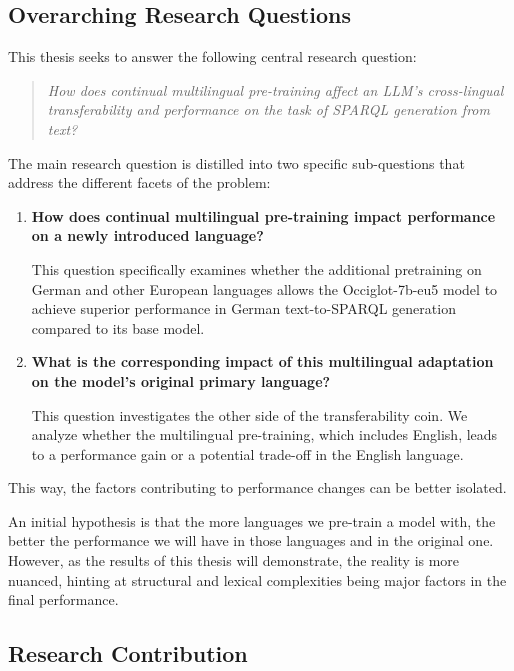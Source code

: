 \subsection{Overarching Research Questions}

This thesis seeks to answer the following central research question:
\begin{quote}
\textit{How does continual multilingual pre-training affect an LLM's cross-lingual transferability and performance on the task of SPARQL generation from text?}
\end{quote}

The main research question is distilled into two specific sub-questions that address the different facets of the problem:

\begin{enumerate}
    \item \textbf{How does continual multilingual pre-training impact performance on a newly introduced language?}
    
    This question specifically examines whether the additional pretraining on German and other European languages allows the Occiglot-7b-eu5 model to achieve superior performance in German text-to-SPARQL generation compared to its base model.

    \item \textbf{What is the corresponding impact of this multilingual adaptation on the model's original primary language?}
    
    This question investigates the other side of the transferability coin. We analyze whether the multilingual pre-training, which includes English, leads to a performance gain or a potential trade-off in the English language. 
\end{enumerate}

This way, the factors contributing to performance changes can be better isolated.

An initial hypothesis is that the more languages we pre-train a model with, the better the performance we will have in those languages and in the original one. 
However, as the results of this thesis will demonstrate, the reality is more nuanced, hinting at structural and lexical complexities being major factors in the final performance.


\subsection{Research Contribution}

